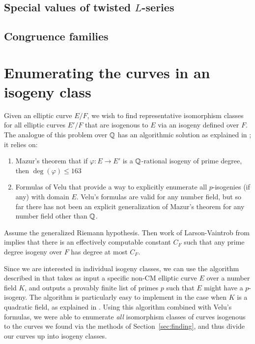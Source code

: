 \documentclass{amsart}
\begin{document}
\subsection{Special values of twisted $L$-series}

\subsection{Congruence families}



\section{Enumerating the curves in an isogeny class}\label{sec:isoclass}

Given an elliptic curve $E/F$, we wish to find representative
isomorphism classes for all elliptic curves $E'/F$ that are isogenous
to $E$ via an isogeny defined over $F$. The analogue of this problem
over $\mathbb{Q}$ has an algorithmic solution as explained in
\cite[\S3.8]{cremona:algs}; it relies on:
\begin{enumerate}
\item  Mazur's theorem \cite{mazur:rational} 
that if $\varphi:E\to E'$ is a $\mathbb{Q}$-rational isogeny of prime degree, 
then $\deg(\varphi)\leq 163$
\item Formulas of Velu \cite{velu:isogenies} 
that provide a way to explicitly enumerate all $p$-isogenies (if any) with domain $E$.  
Velu's formulas are valid for any number field, but so far there has not been an explicit
generalization of Mazur's theorem for any number field other than $\mathbb{Q}$. 
\end{enumerate}

\begin{remark}
  Assume the generalized Riemann hypothesis.  Then work of Larson-Vaintrob 
  from \cite{larson-vaintrob} implies that there is an effectively computable constant $C_F$ 
  such that any prime degree isogeny over $F$ has degree at most $C_F$.
\end{remark}

Since we are interested in individual isogeny classes, 
we can use the algorithm described in \cite{billerey:isog} that takes as
input a specific non-CM elliptic curve $E$ over a number field $K$, and
outputs a provably finite list of primes $p$ such that $E$ might have a
$p$-isogeny. The algorithm is particularly easy to implement in the
case when $K$ is a quadratic field, as explained in
\cite[\S2.3.4]{billerey:isog}.  Using this algorithm combined with
Velu's formulas, we were able to enumerate {\em all}
isomorphism classes of curves isogenous to the curves we found via the
methods of Section~\ref{sec:finding}, and thus divide our curves up into
isogeny classes.
\end{document}

